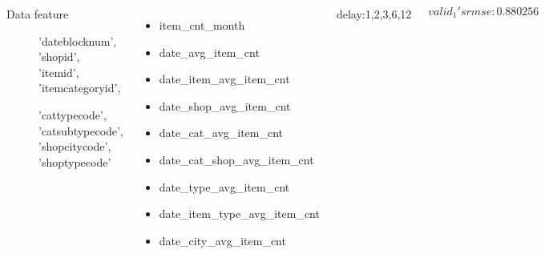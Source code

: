 \documentclass{tikzposter} %
\begin{document}
\begin{columns}
{
  \begin{description}
    \item[Data feature] 'dateblocknum', 'shopid', 'itemid', 'itemcategoryid', \par
    'cattypecode', 'catsubtypecode', 'shopcitycode', 'shoptypecode'
  \end{description}
    
  
 
    \begin{itemize}
      \item item\_cnt\_month
      \item date\_avg\_item\_cnt
      \item date\_item\_avg\_item\_cnt
      \item date\_shop\_avg\_item\_cnt
      \item date\_cat\_avg\_item\_cnt
      \item date\_cat\_shop\_avg\_item\_cnt
      \item date\_type\_avg\_item\_cnt
      \item date\_item\_type\_avg\_item\_cnt
      \item date\_city\_avg\_item\_cnt
    \end{itemize}
    delay:1,2,3,6,12

}

{
 $valid_1's rmse: 0.880256$

}





\end{columns}


\end{document}
